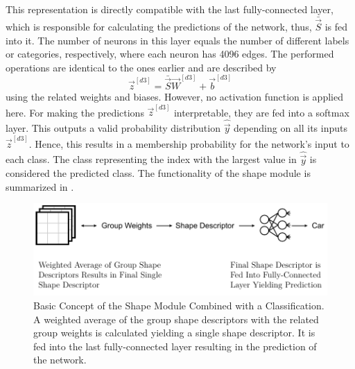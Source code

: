 This representation is directly compatible with the last fully-connected layer, which is responsible for calculating the predictions of the network, thus, $\bar{\vec{S}}$ is fed into it.
The number of neurons in this layer equals the number of different labels or categories, respectively, where each neuron has 4096 edges.
The performed operations are identical to the ones earlier and are described by
\begin{equation}
	\vec{z}^{[d3]} = \bar{\vec{S}} \vec{W}^{[d3]} + \vec{b}^{[d3]}
\end{equation}
using the related weights and biases.
However, no activation function is applied here.
For making the predictions $\vec{z}^{[d3]}$ interpretable, they are fed into a softmax layer.
This outputs a valid probability distribution $\hat{\vec{y}}$ depending on all its inputs $\vec{z}^{[d3]}$.
Hence, this results in a membership probability for the network's input to each class.
The class representing the index with the largest value in $\hat{\vec{y}}$ is considered the predicted class. The functionality of the shape module is summarized in .
\begin{figure}
	\centering
	\includegraphics[]{images/shape_module_final_shape.pdf}
	\caption[Basic Concept of the Shape Module]{Basic Concept of the Shape Module Combined with a Classification. A weighted average of the group shape descriptors with the related group weights is calculated yielding a single shape descriptor. It is fed into the last fully-connected layer resulting in the prediction of the network.}
	\label{fig:shape-module-final-shape}
\end{figure}